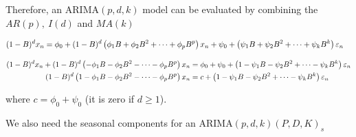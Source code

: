 Therefore, an ARIMA$(p,d,k)$ model can be evaluated by combining the $AR(p),\ I(d)$ and $MA(k)$

\begin{align}
(1-B)^d x_n
&= \phi_0+(1-B)^d\left(\phi_1 B+\phi_2 B^2 +\dots + \phi_p B^p\right)x_n +
\psi_0+\left(\psi_1 B+\psi_2 B^2 +\dots + \psi_k B^k\right)\varepsilon_n \nonumber 
\end{align}

\begin{align}
(1-B)^d x_n + (1-B)^d\left(-\phi_1 B-\phi_2 B^2 -\dots - \phi_p B^p\right)x_n
&= \phi_0 + \psi_0+\left(1-\psi_1 B-\psi_2 B^2 +\dots - \psi_k B^k\right)\varepsilon_n  \nonumber \\
(1-B)^d\left(1-\phi_1 B-\phi_2 B^2 -\dots - \phi_p B^p\right)x_n
&=c+\left(1-\psi_1 B-\psi_2 B^2 +\dots - \psi_k B^k\right)\varepsilon_n  \nonumber \\
\end{align}

where $c= \phi_0 + \psi_0$ (it is zero if $d\geq1$).

We also need the seasonal components for an ARIMA$(p,d,k)(P,D,K)_s$ 

